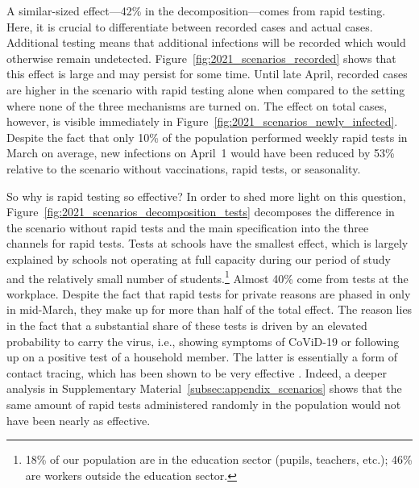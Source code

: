 \documentclass[12pt]{article}
\begin{document}
A similar-sized effect---42\% in the decomposition---comes from rapid testing. Here, it
is crucial to differentiate between recorded cases and actual cases. Additional testing
means that additional infections will be recorded which would otherwise remain
undetected. Figure~\ref{fig:2021_scenarios_recorded} shows that this effect is large and
may persist for some time. Until late April, recorded cases are higher in the scenario
with rapid testing alone when compared to the setting where none of the three mechanisms
are turned on. The effect on total cases, however, is visible immediately in
Figure~\ref{fig:2021_scenarios_newly_infected}. Despite the fact that only 10\% of the
population performed weekly rapid tests in March on average, new infections on April~1
would have been reduced by 53\% relative to the scenario without vaccinations, rapid
tests, or seasonality.

So why is rapid testing so effective? In order to shed more light on this question,
Figure~\ref{fig:2021_scenarios_decomposition_tests} decomposes the difference in the
scenario without rapid tests and the main specification into the three channels for
rapid tests. Tests at schools have the smallest effect, which is largely explained by
schools not operating at full capacity during our period of study and the relatively
small number of students.\footnote{18\% of our population are in the education sector
    (pupils, teachers, etc.); 46\% are workers outside the education sector.} Almost 40\%
come from tests at the workplace. Despite the fact that rapid tests for private reasons
are phased in only in mid-March, they make up for more than half of the total effect.
The reason lies in the fact that a substantial share of these tests is driven by an
elevated probability to carry the virus, i.e., showing symptoms of CoViD-19 or following
up on a positive test of a household member. The latter is essentially a form of contact
tracing, which has been shown to be very effective \cite{Contreras2021,
    Fetzer2021,Kretzschmar2020}. Indeed, a deeper analysis in Supplementary
Material~\ref{subsec:appendix_scenarios} shows that the same amount of rapid tests
administered randomly in the population would not have been nearly as effective.
\end{document}
